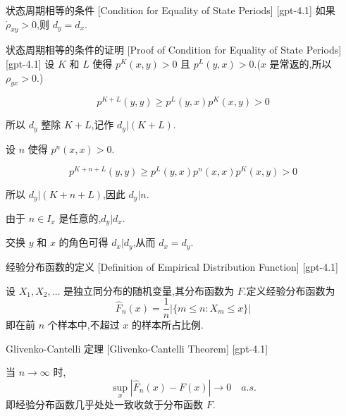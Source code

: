\documentclass[UTF8]{ctexart}
\begin{document}
    
    
    \begin{lma}
        {状态周期相等的条件}
        [Condition for Equality of State Periods]
        [gpt-4.1]
        如果 $\dot{\rho}_{x y} > 0$,则 $d_{y} = d_{x}$.
    \end{lma}
    
    
    
    \begin{prf}
        {状态周期相等的条件的证明}
        [Proof of Condition for Equality of State Periods]
        [gpt-4.1]
        设 $K$ 和 $L$ 使得 $p^{K}(x, y) > 0$ 且 $p^{L}(y, x) > 0$.($x$ 是常返的,所以 $\rho_{y x} > 0$.)

\[
p^{K+L}(y, y) \geq p^{L}(y, x) p^{K}(x, y) > 0
\]

所以 $d_{y}$ 整除 $K+L$,记作 $d_{y} | (K+L)$.

设 $n$ 使得 $p^{n}(x, x) > 0$.

\[
p^{K+n+L}(y, y) \geq p^{L}(y, x) p^{n}(x, x) p^{K}(x, y) > 0
\]

所以 $d_{y} | (K+n+L)$,因此 $d_{y} | n$.

由于 $n \in I_{x}$ 是任意的,$d_{y} | d_{x}$.

交换 $y$ 和 $x$ 的角色可得 $d_{x} | d_{y}$,从而 $d_{x} = d_{y}$.
    \end{prf}
    
    
    
    \begin{dfn}
        {经验分布函数的定义}
        [Definition of Empirical Distribution Function]
        [gpt-4.1]
        
设 $X_{1}, X_{2}, \dots$ 是独立同分布的随机变量,其分布函数为 $F$.定义经验分布函数为
\[
\hat{F}_{n}(x) = \frac{1}{n} | \{ m \leq n : X_{m} \leq x \} |
\]
即在前 $n$ 个样本中,不超过 $x$ 的样本所占比例.

    \end{dfn}
    
    
    
    \begin{thm}
        {Glivenko-Cantelli 定理}
        [Glivenko-Cantelli Theorem]
        [gpt-4.1]
        
当 $n \to \infty$ 时,
\[
\sup_{x} | \hat{F}_{n}(x) - F(x) | \to 0 \quad a.s.
\]
即经验分布函数几乎处处一致收敛于分布函数 $F$.

    \end{thm}
    
\end{document}
